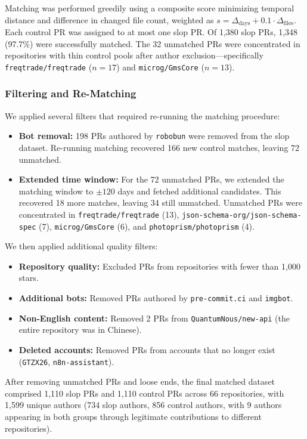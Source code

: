 \documentclass[11pt]{article}
\begin{document}
	Matching was performed greedily using a composite score minimizing temporal distance and difference in changed file count, weighted as $s = \Delta_{\text{days}} + 0.1 \cdot \Delta_{\text{files}}$. Each control PR was assigned to at most one slop PR. Of 1,380 slop PRs, 1,348 (97.7\%) were successfully matched. The 32 unmatched PRs were concentrated in repositories with thin control pools after author exclusion---specifically \texttt{freqtrade/freqtrade} ($n=17$) and \texttt{microg/GmsCore} ($n=13$).
	
	\subsubsection{Filtering and Re-Matching}
	
	We applied several filters that required re-running the matching procedure:
	
	\begin{itemize}
		\item \textbf{Bot removal:} 198 PRs authored by \texttt{robobun} were removed from the slop dataset. Re-running matching recovered 166 new control matches, leaving 72 unmatched.
		\item \textbf{Extended time window:} For the 72 unmatched PRs, we extended the matching window to $\pm 120$ days and fetched additional candidates. This recovered 18 more matches, leaving 34 still unmatched. Unmatched PRs were concentrated in \texttt{freqtrade/freqtrade} (13), \texttt{json-schema-org/json-schema-spec} (7), \texttt{microg/GmsCore} (6), and \texttt{photoprism/photoprism} (4).
	\end{itemize}
	
	We then applied additional quality filters:
	
	\begin{itemize}
		\item \textbf{Repository quality:} Excluded PRs from repositories with fewer than 1,000 stars.
		\item \textbf{Additional bots:} Removed PRs authored by \texttt{pre-commit.ci} and \texttt{imgbot}.
		\item \textbf{Non-English content:} Removed 2 PRs from \texttt{QuantumNous/new-api} (the entire repository was in Chinese).
		\item \textbf{Deleted accounts:} Removed PRs from accounts that no longer exist (\texttt{GTZX26}, \texttt{n8n-assistant}).
	\end{itemize}
	
	After removing unmatched PRs and loose ends, the final matched dataset comprised 1,110 slop PRs and 1,110 control PRs across 66 repositories, with 1,599 unique authors (734 slop authors, 856 control authors, with 9 authors appearing in both groups through legitimate contributions to different repositories).
	
\end{document}
